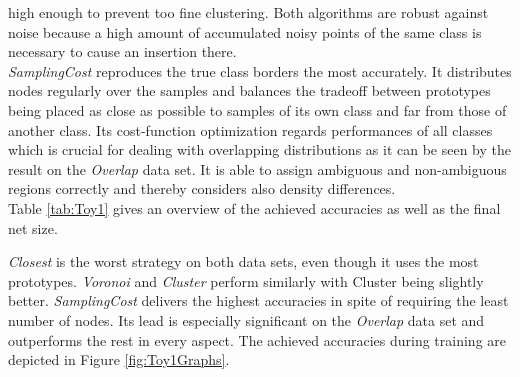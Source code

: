 \documentclass[conference]{IEEEtran}
\begin{document}
high enough to prevent too fine clustering. Both algorithms are robust against noise because a high amount of accumulated noisy points of the same class 
is necessary to cause an insertion there. \\
\textit{SamplingCost} reproduces the true class borders the most accurately. It distributes nodes regularly over the samples and
 balances the tradeoff between prototypes being placed as close as possible to samples of its own class and far from those of another class.
Its cost-function optimization regards performances of all classes which is crucial for dealing with overlapping distributions as it can be seen by  the result on the \textit{Overlap} data set.
It is able to assign ambiguous and non-ambiguous regions correctly and thereby considers also density differences.\\
Table \ref{tab:Toy1} gives an overview of the achieved accuracies as well as the final net size.
\begin{table}
\caption{Results on the artificial data. The averaged test-accuracy and net-size of ten repetitions are depicted.}
\label{tab:Toy1}
\centering
{}
\end{table}
\textit{Closest} is the worst strategy on both data sets, even though it uses the most prototypes. 
\textit{Voronoi} and \textit{Cluster} perform similarly with Cluster being slightly better.
\textit{SamplingCost} delivers the highest accuracies in spite of requiring the least number of nodes.
Its lead is especially significant on the \textit{Overlap} data set and outperforms the rest in every aspect.
The achieved accuracies during training are depicted in Figure \ref{fig:Toy1Graphs}. 
\end{document}

